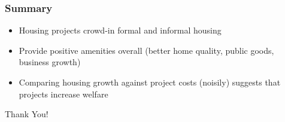 \documentclass[aspectratio=32]{beamer}
\begin{document}
\begin{frame}
\frametitle{Summary}
\begin{itemize}
  \item Housing projects crowd-in formal and informal housing
  \vspace{2mm}
  \item Provide positive amenities overall (better home quality, public goods, business growth)
  \vspace{2mm}
  \item Comparing housing growth against project costs (noisily) suggests that projects increase welfare
\end{itemize}
{\Large
  \begin{center}
  Thank You!
  \end{center}
}

\end{frame}

\end{document}
